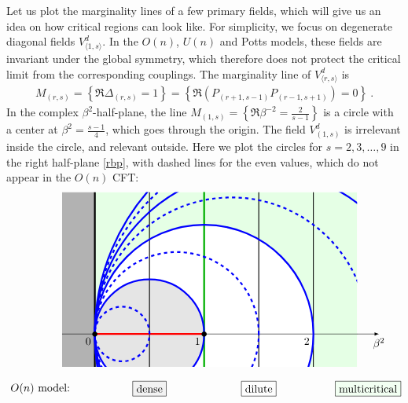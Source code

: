 \documentclass[12pt, a4paper]{article}
\theoremstyle{break}
\begin{document}
Let us plot the marginality lines of a few primary fields, which will give us an idea on how critical regions can look like. For simplicity, we focus on degenerate diagonal fields $V^d_{\langle 1,s\rangle}$. In the $O(n)$, $U(n)$ and Potts models, these fields are invariant under the global symmetry, which therefore does not protect the critical limit from the corresponding couplings. The marginality line of $V^d_{\langle r,s\rangle}$ is
\begin{align}
 M_{(r,s)} = \left\{\Re\Delta_{(r,s)} = 1 \right\} = \left\{\Re \left(P_{(r+1,s-1)}P_{(r-1,s+1)}\right) = 0\right\} \ . 
\end{align}
In the complex $\beta^2$-half-plane, the line $M_{(1,s)}=\left\{\Re\beta^{-2}=\frac{2}{s-1}\right\}$ is a circle with a center at $\beta^2=\frac{s-1}{4}$, which goes through the origin. The field $V^d_{(1,s)}$ is irrelevant inside the circle, and relevant outside. Here we plot the circles for $s=2,3,\dots, 9$ in the right half-plane \eqref{rbp}, with dashed lines for the even values, which do not appear in the $O(n)$ CFT:
\begin{align}
 \begin{tikzpicture}[baseline=(current  bounding  box.center), scale = 3.5]
 \draw [-latex] (-.3, 0) -- (2.6, 0) node[below]{$\beta^2$};
 \node at (-.5, -.5) {$O(n)$ model:};
 \node[draw, fill = black!5] at (.5, -.5) {dense};
 \node[draw] at (1.5, -.5) {dilute};
 \node[draw, fill = green!5] at (2.5, -.5) {multicritical};
 \clip (-.3, -.3) -- (-.3, 1.3) -- (2.4, 1.3) -- (2.4, -.3) -- cycle;
 \fill [color = green!10] (0, -1.3) -- (2.4, -1.3) -- (2.4, 1.3) -- (0, 1.3) -- cycle;
  \fill [color = white] (1, 0) circle [radius = 1];
 \fill [color = black!10] (.5, 0) circle [radius = .5];
 \fill [color = black!30] (0, -1.3) -- (-.3, -1.3) -- (-.3, 1.3) -- (0, 1.3) -- cycle;
 \draw[ultra thick] (0, -1.3) -- (0, 1.3);
 \draw[thick] (.5, -1.3) -- (.5, 1.3);
 \draw[thick] (1, -1.3) -- (1, 1.3);
 \draw[thick] (1.5, -1.3) -- (1.5, 1.3);
 \draw[thick] (2, -1.3) -- (2, 1.3);
 \draw[ultra thick, green!70!black] (1, -1) -- (1,1.5);
  \draw [-latex] (-.3, 0) -- (0, 0) node [below left] {$0$} -- (1, 0) node [below left] {$1$} -- (2, 0) node[below left] {$2$} -- (2.6, 0);
   \draw [ultra thick, red] (0, 0) -- (1, 0); 
  \foreach \s in {2,4,6,8}{
  \draw [ultra thick, dashed, blue] ({(\s-1)/4}, 0) circle [radius = (\s-1)/4];
  \draw [ultra thick, blue] ({\s/4}, 0) circle [radius = \s/4];
  }
 \node at (1, 0) [fill, circle, scale = .5] {};
 \node at (0, 0) [fill, circle, scale = .5] {};
 \end{tikzpicture} 
\end{align}
\end{document}
